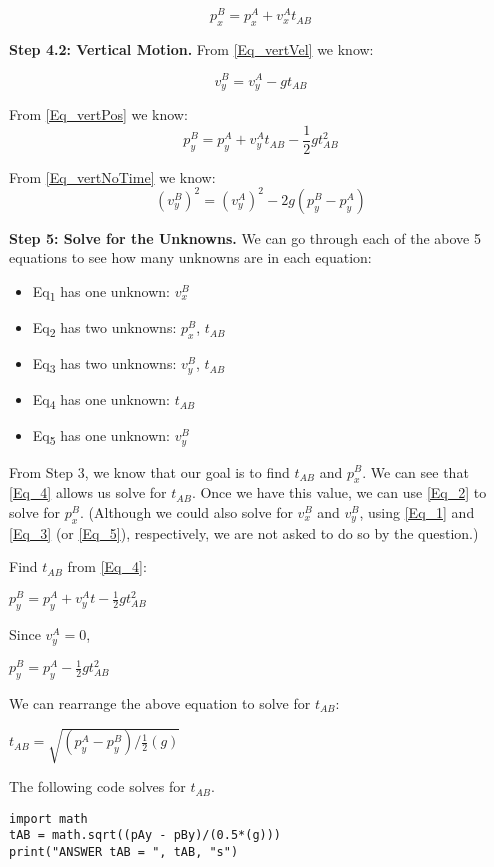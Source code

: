 \documentclass[11pt]{article}
\begin{document}
\begin{equation}
\label{Eq_2}
p_x^B = p_x^A + v_x^A t_{AB}
\end{equation}

\textbf{Step 4.2: Vertical Motion.} From \ref{Eq_vertVel} we know:

\begin{equation}
\label{Eq_3}
v_y^B = v_y^A - g t_{AB}
\end{equation}

From \ref{Eq_vertPos} we know:
\begin{equation}
\label{Eq_4}
p_y^B = p_y^A + v_y^A t_{AB} - \frac{1}{2} g t_{AB}^2
\end{equation}

From \ref{Eq_vertNoTime} we know:
\begin{equation}
\label{Eq_5}
(v_y^B)^2 = (v_y^A)^2 - 2 g ( p_y^B - p_y^A)
\end{equation}

\textbf{Step 5: Solve for the Unknowns.} We can go through each of the above
5 equations to see how many unknowns are in each equation:

\begin{itemize}
\item Eq\textsubscript{1} has one unknown: \(v_x^B\)
\item Eq\textsubscript{2} has two unknowns: \(p_x^B\), \(t_{AB}\)
\item Eq\textsubscript{3} has two unknowns: \(v_y^B\), \(t_{AB}\)
\item Eq\textsubscript{4} has one unknown: \(t_{AB}\)
\item Eq\textsubscript{5} has one unknown: \(v_y^B\)
\end{itemize}

From Step 3, we know that our goal is to find \(t_{AB}\) and \(p_x^B\).
We can see that \ref{Eq_4} allows us solve for \(t_{AB}\).  Once we have this
value, we can use \ref{Eq_2} to solve for \(p_x^B\).  (Although we could also
solve for \(v_x^B\) and \(v_y^B\), using \ref{Eq_1} and \ref{Eq_3} (or \ref{Eq_5}),
respectively, we are not asked to do so by the question.)

Find \(t_{AB}\) from \ref{Eq_4}:

\(p^B_y = p^A_y + v^A_y t - \frac{1}{2} g t_{AB}^2\)

Since \(v^A_y = 0\), 

\(p^B_y = p^A_y - \frac{1}{2} g t_{AB}^2\)

We can rearrange the above equation to solve for \(t_{AB}\): 

\(t_{AB} = \sqrt{(p^A_y - p^B_y)/\frac{1}{2}(g)}\)

The following code solves for \(t_{AB}\).

\begin{verbatim}
import math
tAB = math.sqrt((pAy - pBy)/(0.5*(g)))
print("ANSWER tAB = ", tAB, "s")
\end{verbatim}
\end{document}
